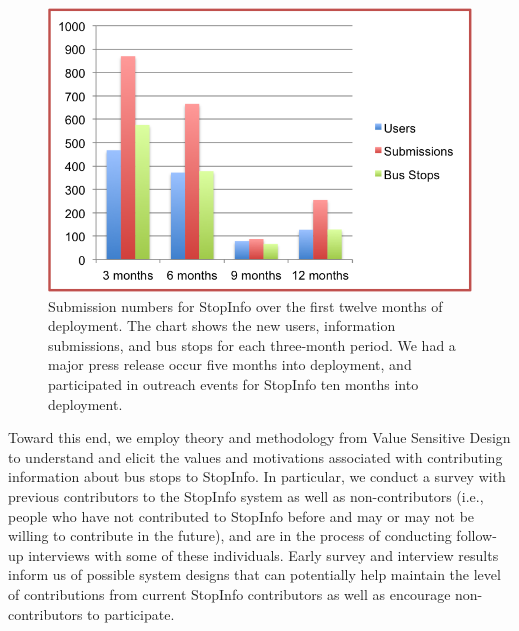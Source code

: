 \begin{figure}[H]
\centering
\includegraphics[width=.45\textwidth]{Chart2.png}
\caption{Submission numbers for StopInfo over the first twelve months of deployment. The chart shows the new users, information submissions, and bus stops for each three-month period. We had a major press release occur five months into deployment, and participated in outreach events for StopInfo ten months into deployment.}
\label{fig:submissions}
\end{figure} 


Toward this end, we employ theory and methodology from Value Sensitive Design \cite{friedman-amis-2006} to understand and elicit the values and motivations associated with contributing information about bus stops to StopInfo. In particular, we conduct a survey with previous contributors to the StopInfo system as well as non-contributors (i.e., people who have not contributed to StopInfo before and may or may not be willing to contribute in the future), and are in the process of conducting follow-up interviews with some of these individuals. Early survey and interview results inform us of possible system designs that can potentially help maintain the level of contributions from current StopInfo contributors as well as encourage non-contributors to participate. 




